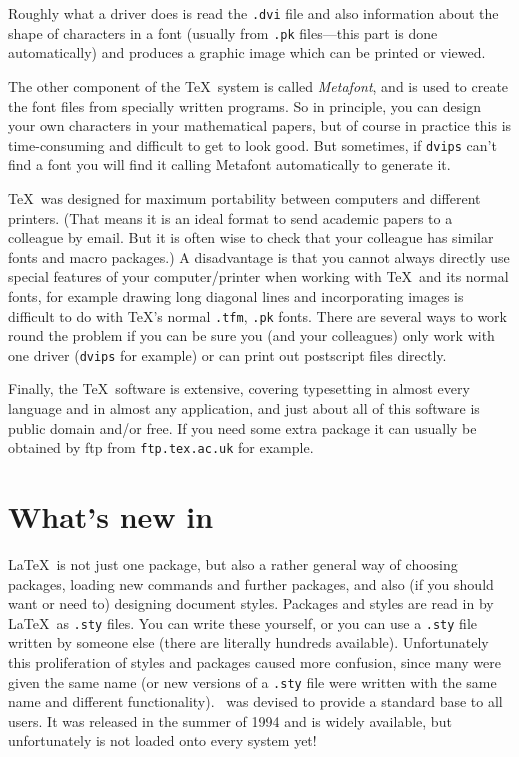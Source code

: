 \documentclass[11pt,a4paper]{article}
\newcommand{\fn}[1]{{\tt #1}}
\begin{document}
Roughly what a driver does is read the \fn{.dvi} file and also
information about the shape of characters in a font (usually from
\fn{.pk} files---this part is done automatically) and produces a 
graphic image which can be printed or viewed.

The other component of the \TeX~system is called {\it Metafont},
and is used to create the font files from specially written programs.
So in principle, you can design your own characters in your 
mathematical papers, but of course in practice this is time-consuming
and difficult to get to look good.  But sometimes, if \fn{dvips}
can't find a font you will find it calling Metafont automatically to 
generate it.

\TeX\ was designed for maximum portability between computers and 
different printers.  (That means it is an ideal format to send academic 
papers to a colleague by email.  But it is often wise to check that your
colleague has similar fonts and macro packages.)  A disadvantage is that
you cannot always directly use special features of your computer/printer
when working with \TeX\ and its normal fonts, for example drawing long 
diagonal lines and incorporating images is difficult to do with
\TeX's normal \fn{.tfm}, \fn{.pk} fonts.  There are several ways
to work round the problem if you can be sure you (and your colleagues)
only work with one driver (\fn{dvips} for example) or can print out
postscript files directly.

Finally, the \TeX\ software is extensive, covering typesetting in 
almost every language and in almost any application, and
just about all of this software is public domain
and/or free.  If you need some extra package it can usually be
obtained by ftp from \fn{ftp.tex.ac.uk} for example.

\section{What's new in \LaTeXe}

\LaTeX\ is not just one package, but also a rather general way of
choosing packages, loading new commands and further packages, and also
(if you should want or need to) designing document styles.  Packages
and styles are read in by \LaTeX\ as \fn{.sty} files.  You can write 
these yourself, or you can use a \fn{.sty} file written by someone
else (there are literally hundreds available).  Unfortunately this
proliferation of styles and packages caused more confusion, since
many were given the same name (or new versions of a \fn{.sty} file
were written with the same name and different functionality).  
\LaTeXe\ was devised to provide a standard base to all users.  
It was released in the summer of 1994 and is widely available, but 
unfortunately is not loaded onto every system yet!
\end{document}

